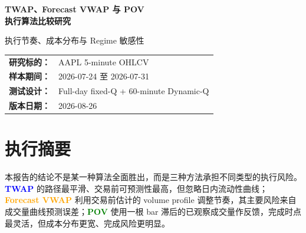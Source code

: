 \documentclass[11pt,a4paper,fontset=fandol]{ctexart}
\newcommand{\algoTWAP}{\textcolor{blue}{\textbf{TWAP}}}
\newcommand{\algoVWAP}{\textcolor{orange}{\textbf{Forecast VWAP}}}
\newcommand{\algoPOV}{\textcolor{green}{\textbf{POV}}}
\begin{document}
\begin{titlepage}
  \thispagestyle{empty}
  \vspace*{1.4cm}
  \noindent{\color{navy}\rule{\textwidth}{1.2pt}}\par\vspace{1.1cm}
  {\fontsize{25}{32}\selectfont\bfseries\color{navy}
    TWAP、Forecast VWAP 与 POV\\[0.25cm]
    执行算法比较研究\par}
  \vspace{0.8cm}
  {\Large\color{darkgray}执行节奏、成本分布与 Regime 敏感性}
  \vspace{1.4cm}

  \begin{center}
  \begin{tabular}{rl}
    \textbf{研究标的：} & AAPL 5-minute OHLCV \\
    \textbf{样本期间：} & 2026-07-24 至 2026-07-31 \\
    \textbf{测试设计：} & Full-day fixed-Q + 60-minute Dynamic-Q \\
    \textbf{版本日期：} & 2026-08-26 \\
  \end{tabular}
  \end{center}

  \vfill
  \begin{center}
  \end{center}
  \vfill
  \par
  \vspace{0.8cm}
  \noindent{\color{navy}\rule{\textwidth}{1.2pt}}
\end{titlepage}

\section*{执行摘要}

本报告的结论不是某一种算法全面胜出，而是三种方法承担不同类型的执行风险。\algoTWAP{} 的路径最平滑、交易前可预测性最高，但忽略日内流动性曲线；\algoVWAP{} 利用交易前估计的 volume profile 调整节奏，其主要风险来自成交量曲线预测误差；\algoPOV{} 使用一根 bar 滞后的已观察成交量作反馈，完成时点最灵活，但成本分布更宽、完成风险更明显。
\end{document}
